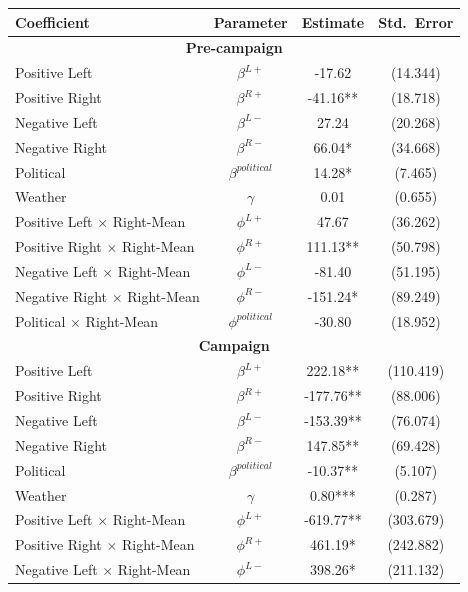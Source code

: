 \documentclass[12pt]{article}
\begin{document}
	\begin{table}[!htb]
		\label{tab:logit}
		\centering
		\begin{threeparttable}
			\begin{tabular}{lccc}
				\hline
				\textbf{Coefficient} & \textbf{Parameter} & \textbf{Estimate} & \textbf{Std.\ Error} \\
				\hline
				\hline
				\multicolumn{4}{c}{\textbf{Pre-campaign}} \\
				\hline
				Positive Left & $\beta^{L+}$ & -17.62 & (14.344) \\
				Positive Right & $\beta^{R+}$ & -41.16** & (18.718) \\
				Negative Left & $\beta^{L-}$ & 27.24 & (20.268) \\
				Negative Right & $\beta^{R-}$ & 66.04* & (34.668) \\
				Political & $\beta^{political}$ & 14.28* & (7.465) \\
				Weather & $\gamma$ & 0.01 & (0.655) \\
				Positive Left $\times$ Right-Mean & $\phi^{L+}$ & 47.67 & (36.262) \\
				Positive Right $\times$ Right-Mean & $\phi^{R+}$ & 111.13** & (50.798) \\
				Negative Left $\times$ Right-Mean & $\phi^{L-}$ & -81.40 & (51.195) \\
				Negative Right $\times$ Right-Mean & $\phi^{R-}$ & -151.24* & (89.249) \\
				Political $\times$ Right-Mean & $\phi^{political}$ & -30.80 & (18.952) \\
				\hline
				\hline
				\multicolumn{4}{c}{\textbf{Campaign}} \\
				\hline
				Positive Left & $\beta^{L+}$ & 222.18** & (110.419) \\
				Positive Right & $\beta^{R+}$ & -177.76** & (88.006) \\
				Negative Left & $\beta^{L-}$ & -153.39** & (76.074) \\
				Negative Right & $\beta^{R-}$ & 147.85** & (69.428) \\
				Political & $\beta^{political}$ & -10.37** & (5.107) \\
				Weather & $\gamma$ & 0.80*** & (0.287) \\
				Positive Left $\times$ Right-Mean & $\phi^{L+}$ & -619.77** & (303.679) \\
				Positive Right $\times$ Right-Mean & $\phi^{R+}$ & 461.19* & (242.882) \\
				Negative Left $\times$ Right-Mean & $\phi^{L-}$ & 398.26* & (211.132) \\

\end{tabular}
\end{threeparttable}
\end{table}
\end{document}
